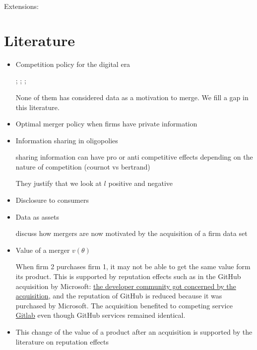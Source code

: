 \documentclass[a4paper,leqno]{article}%
\renewcommand{\t}{\theta}
\renewcommand{\t}{\theta}
\begin{document}
Extensions: 






\section{Literature}
\begin{itemize}\setlength\itemsep{-1em}
    \item Competition policy for the digital era
    
    \cite{tirole2020competition}; \cite{scott2019committee}; \cite{cremer2019competition}; \cite{cabral2020merger}
    
    None of them has considered data as a motivation to merge. We fill a gap in this literature.
    
    \item Optimal merger policy when firms have private information \cite{Besanko1993}
    \item Information sharing in oligopolies
    
    \cite{vives1984duopoly, gal1986information} sharing information can have pro or anti competitive effects depending on the nature of competition (cournot vs bertrand)
    
    They justify that we look at $l$ positive and negative
    \item Disclosure to consumers 
    \item Data as assets
    
    \cite{stucke2016introduction} discuss how mergers are now motivated by the acquisition of a firm data set
    
    \item Value of a merger $v(\t)$
    
    When firm 2 purchases firm 1, it may not be able to get the same value form its product. This is supported by reputation effects such as in the GitHub acquisition by Microsoft: \href{https://www.theverge.com/2018/10/26/17954714/microsoft-github-deal-acquisition-complete}{the developer community got concerned by the acquisition}, and the reputation of GitHub is reduced because it was purchased by Microsoft. The acquisition benefited to competing service \href{https://www.itprotoday.com/linux/why-open-source-software-moving-gitlab-after-microsoft-github-deal}{Gitlab} even though GitHub services remained identical.
    
    \item This change of the value of a product after an acquisition is supported by the literature on reputation effects \citep{tadelis1999s}
    

\end{itemize}
\end{document}
